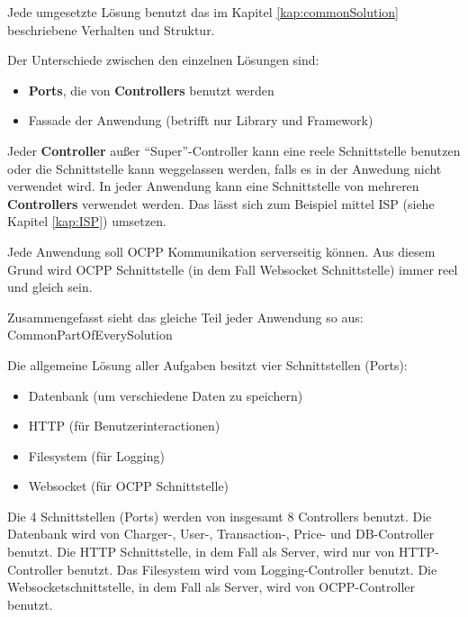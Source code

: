 Jede umgesetzte Lösung benutzt das im Kapitel \ref{kap:commonSolution} beschriebene Verhalten und Struktur. 

Der Unterschiede zwischen den einzelnen Lösungen sind:
\begin{itemize}
    \item \textbf{Ports}, die von \textbf{Controllers} benutzt werden
    \item Fassade der Anwendung (betrifft nur Library und Framework)
\end{itemize}

Jeder \textbf{Controller} außer ``Super''-Controller kann eine reele Schnittstelle benutzen oder die Schnittstelle kann weggelassen werden, 
falls es in der Anwedung nicht verwendet wird. In jeder Anwendung kann eine Schnittstelle von mehreren \textbf{Controllers} verwendet werden.
Das lässt sich zum Beispiel mittel ISP (siehe Kapitel \ref{kap:ISP}) umsetzen.

Jede Anwendung soll OCPP Kommunikation serverseitig können. 
Aus diesem Grund wird OCPP Schnittstelle (in dem Fall Websocket Schnittstelle) immer reel und gleich sein.

Zusammengefasst sieht das gleiche Teil jeder Anwendung so aus:
{CommonPartOfEverySolution}

Die allgemeine Lösung aller Aufgaben besitzt vier Schnittstellen (Ports):
\begin{itemize}
    \item Datenbank (um verschiedene Daten zu speichern)
    \item HTTP (für Benutzerinteractionen)
    \item Filesystem (für Logging)
    \item Websocket (für OCPP Schnittstelle)
\end{itemize}

Die 4 Schnittstellen (Ports) werden von insgesamt 8 Controllers benutzt.
Die Datenbank wird von Charger-, User-, Transaction-, Price- und DB-Controller benutzt.
Die HTTP Schnittstelle, in dem Fall als Server, wird nur von HTTP-Controller benutzt.
Das Filesystem wird vom Logging-Controller benutzt.
Die Websocketschnittstelle, in dem Fall als Server, wird von OCPP-Controller benutzt.
